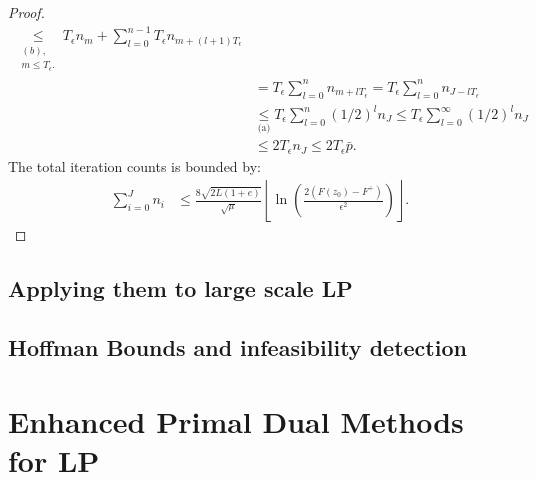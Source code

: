 \documentclass[12pt]{report}
\begin{document}
\begin{proof}
\begin{align*}
                \underset{\substack{(b), \\ m \le T_\epsilon.}}\le T_\epsilon n_m + \sum_{l = 0}^{n - 1} T_\epsilon n_{m + (l + 1)T_\epsilon}
                \\
                &= T_\epsilon \sum_{l = 0}^{n} n_{m + lT_\epsilon} = T_\epsilon \sum_{l = 0}^{n} n_{J - lT_\epsilon}
                \\
                &\underset{\text{(a)}}{\le} T_\epsilon \sum_{l = 0}^{n} (1/2)^l n_J \le T_\epsilon \sum_{l = 0}^{\infty} (1/2)^l n_J
                \\
                &\le 2T_\epsilon n_J \le 2T_\epsilon \bar p.
            \end{align*}
            The total iteration counts is bounded by: 
            \begin{align*}
                \sum_{i = 0}^{J} n_i &\le 
                \frac{8\sqrt{2L(1 + e)}}{\sqrt{\mu}} \left\lfloor 
                \ln \left(
                    \frac{2(F(z_0) - F^+)}{\epsilon^2}
                \right) 
                \right\rfloor. 
            \end{align*}
        \end{proof}
        \begin{theorem}\label{thm:rgmapg-cnvg}
            
        \end{theorem}

    \section{Applying them to large scale LP}
    
    \section{Hoffman Bounds and infeasibility detection}
    
\chapter{Enhanced Primal Dual Methods for LP}
    






\end{document}
